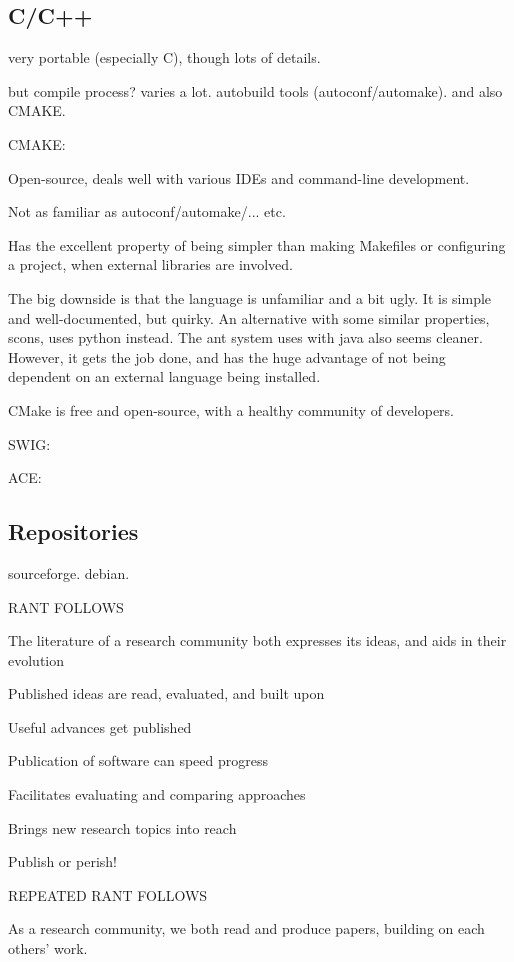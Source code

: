 \subsection{C/C++}

very portable (especially C), though lots of details.

but compile process?  varies a lot. autobuild tools
(autoconf/automake).  and also CMAKE.

CMAKE:

Open-source, deals well with various IDEs and command-line development.

Not as familiar as autoconf/automake/... etc.

Has the excellent property of being simpler than making Makefiles
or configuring a project, when external libraries are involved.

The big downside is that the language is unfamiliar and a bit ugly.
It is simple and well-documented, but quirky.  An alternative with
some similar properties, scons, uses python instead.  The ant system
uses with java also seems cleaner.  However, it gets the job
done, and has the huge advantage of not being dependent on an
external language being installed.

CMake is free and open-source, with a healthy community of 
developers.


SWIG:

ACE:


\subsection{Repositories}

sourceforge.  debian.

RANT FOLLOWS

The literature of a research community both expresses its ideas, and
aids in their evolution

Published ideas are read, evaluated, and built upon

Useful advances get published

Publication of software can speed progress

Facilitates evaluating and comparing approaches

Brings new research topics into reach

Publish or perish!

REPEATED RANT FOLLOWS

As a research community, we both read and produce papers, building on
each others' work.

